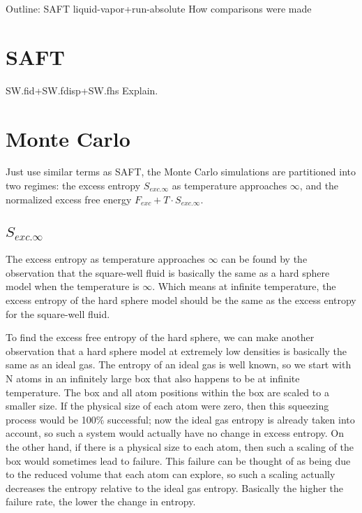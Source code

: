 Outline:
SAFT\newline
liquid-vapor+run-absolute\newline
How comparisons were made\newline
\section{SAFT}
SW.fid+SW.fdisp+SW.fhs Explain.
\section{Monte Carlo}
Just use similar terms as SAFT, the Monte Carlo simulations are partitioned into two regimes: the excess entropy $S_{exc.\infty}$ as temperature approaches $\infty$, and the normalized excess free energy $F_{exc}+T\cdot S_{exc.\infty}$.
\subsection{$S_{exc.\infty}$}
The excess entropy as temperature approaches $\infty$ can be found by the observation that the square-well fluid is basically the same as a hard sphere model when the temperature is $\infty$. Which means at infinite temperature, the excess entropy of the hard sphere model should be the same as the excess entropy for the square-well fluid. 

To find the excess free entropy of the hard sphere, we can make another observation that a hard sphere model at extremely low densities is basically the same as an ideal gas. The entropy of an ideal gas is well known, so we start with N atoms in an infinitely large box that also happens to be at infinite temperature. The box and all atom positions within the box are scaled to a smaller size. If the physical size of each atom were zero, then this squeezing process would be 100\% successful; now the ideal gas entropy is already taken into account, so such a system would actually have no change in excess entropy. On the other hand, if there is a physical size to each atom, then such a scaling of the box would sometimes lead to failure. This failure can be thought of as being due to the reduced volume that each atom can explore, so such a scaling actually decreases the entropy relative to the ideal gas entropy. Basically the higher the failure rate, the lower the change in entropy.

